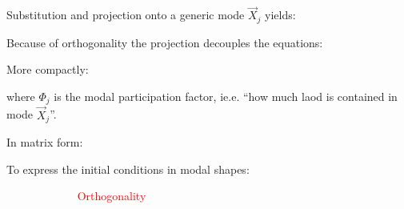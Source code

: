 \documentclass[10pt,a4paper]{scrartcl}
\begin{document}
\begin{multicols*}{2}
Substitution and projection onto a generic mode $\vec{X}_j$ yields:


Because of orthogonality the projection decouples the equations:


More compactly:


where $\Phi_j$ is the modal participation factor, ie.e. ``how much laod is contained in mode $\vec{X}_j$''.

In matrix form:



To express the initial conditions in modal shapes:


\textcolor{red}{$\qquad\qquad\qquad$ Orthogonality}



\end{multicols*}
\end{document}
